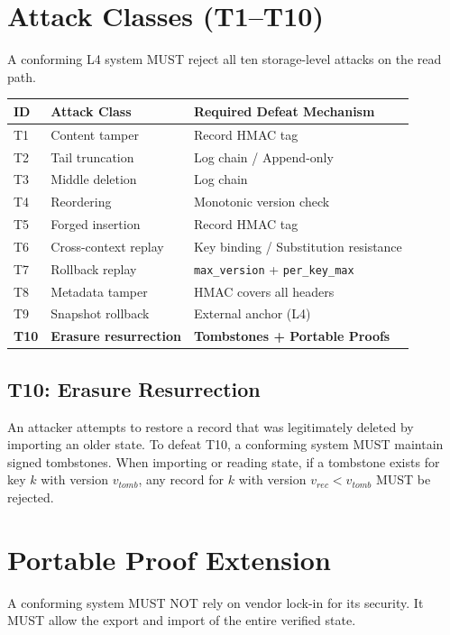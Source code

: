 \documentclass[11pt, a4paper]{article}
\begin{document}
\section{Attack Classes (T1--T10)}
A conforming L4 system MUST reject all ten storage-level attacks on the read path.
\begin{table}[h]
\centering
\begin{tabular}{@{}lll@{}}
\toprule
\textbf{ID} & \textbf{Attack Class} & \textbf{Required Defeat Mechanism} \\
\midrule
T1 & Content tamper & Record HMAC tag \\
T2 & Tail truncation & Log chain / Append-only \\
T3 & Middle deletion & Log chain \\
T4 & Reordering & Monotonic version check \\
T5 & Forged insertion & Record HMAC tag \\
T6 & Cross-context replay & Key binding / Substitution resistance \\
T7 & Rollback replay & \texttt{max\_version} + \texttt{per\_key\_max} \\
T8 & Metadata tamper & HMAC covers all headers \\
T9 & Snapshot rollback & External anchor (L4) \\
\textbf{T10} & \textbf{Erasure resurrection} & \textbf{Tombstones + Portable Proofs} \\
\bottomrule
\end{tabular}
\end{table}

\subsection{T10: Erasure Resurrection}
An attacker attempts to restore a record that was legitimately deleted by importing an older state. To defeat T10, a conforming system MUST maintain signed tombstones. When importing or reading state, if a tombstone exists for key \(k\) with version \(v_{tomb}\), any record for \(k\) with version \(v_{rec} < v_{tomb}\) MUST be rejected.

\section{Portable Proof Extension}
A conforming system MUST NOT rely on vendor lock-in for its security. It MUST allow the export and import of the entire verified state.
\end{document}
